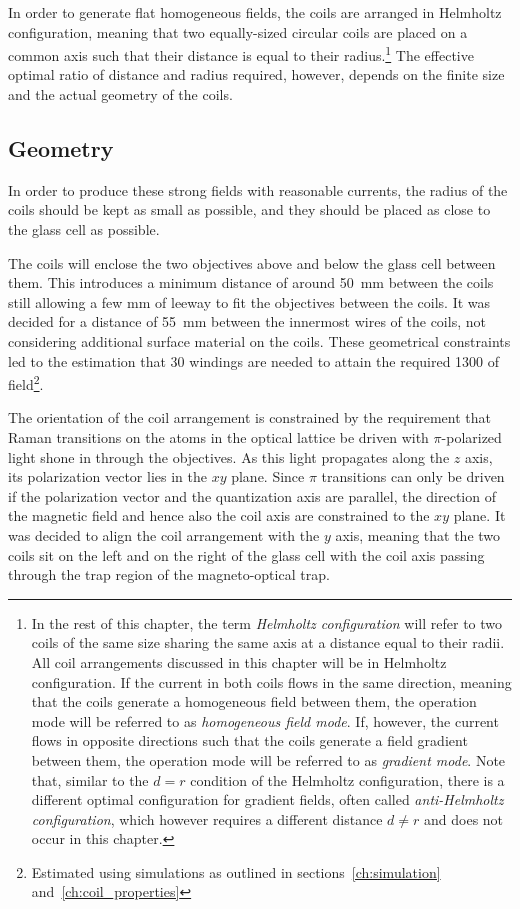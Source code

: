 In order to generate flat homogeneous fields, the coils are arranged in Helmholtz configuration, meaning that two equally-sized circular coils are placed on a common axis such that their distance is equal to their radius.\footnote{In the rest of this chapter, the term \textit{Helmholtz configuration} will refer to two coils of the same size sharing the same axis at a distance equal to their radii. All coil arrangements discussed in this chapter will be in Helmholtz configuration. If the current in both coils flows in the same direction, meaning that the coils generate a homogeneous field between them, the operation mode will be referred to as \textit{homogeneous field mode}. If, however, the current flows in opposite directions such that the coils generate a field gradient between them, the operation mode will be referred to as \textit{gradient mode}. Note that, similar to the $d = r$ condition of the Helmholtz configuration, there is a different optimal configuration for gradient fields, often called \textit{anti-Helmholtz configuration}, which however requires a different distance $d \neq r$ and does not occur in this chapter.} The effective optimal ratio of distance and radius required, however, depends on the finite size and the actual geometry of the coils.

\subsection*{Geometry}
In order to produce these strong fields with reasonable currents, the radius of the coils should be kept as small as possible, and they should be placed as close to the glass cell as possible.

The coils will enclose the two objectives above and below the glass cell between them. This introduces a minimum distance of around \SI{50}{\milli\meter} between the coils still allowing a few \si[]{\milli\meter} of leeway to fit the objectives between the coils. It was decided for a distance of \SI{55}{\milli\meter} between the innermost wires of the coils, not considering additional surface material on the coils. These geometrical constraints led to the estimation that 30 windings are needed to attain the required \SI{1300}{\gauss} of field\footnote{Estimated using simulations  as outlined in sections~\ref{ch:simulation} and~\ref{ch:coil_properties}}.

The orientation of the coil arrangement is constrained by the requirement that Raman transitions on the atoms in the optical lattice be driven with $\pi$-polarized light shone in through the objectives. As this light propagates along the $z$ axis, its polarization vector lies in the $xy$ plane. Since $\pi$ transitions can only be driven if the polarization vector and the quantization axis are parallel, the direction of the magnetic field and hence also the coil axis are constrained to the $xy$ plane. It was decided to align the coil arrangement with the $y$ axis, meaning that the two coils sit on the left and on the right of the glass cell with the coil axis passing through the trap region of the magneto-optical trap.

